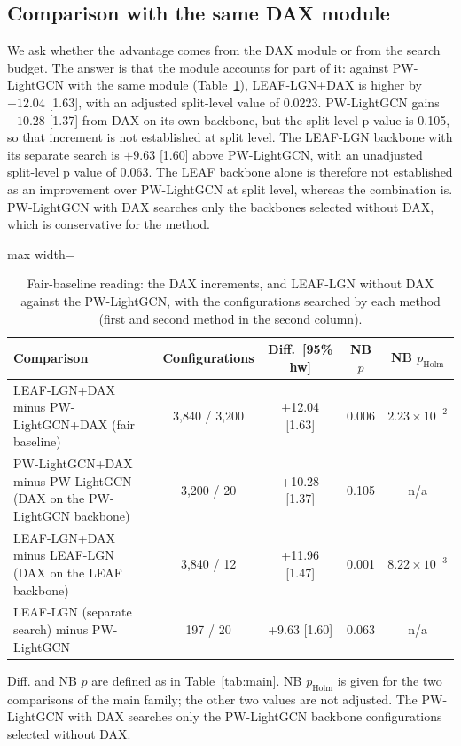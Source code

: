 \documentclass[preprint,12pt,authoryear]{elsarticle}
\begin{document}
\subsection{Comparison with the same DAX module}
\label{sec:res-fair}

We ask whether the advantage comes from the DAX module or from the search budget. The answer is that the module accounts for part of it: against PW-LightGCN with the same module (Table~\ref{tab:fair}), LEAF-LGN+DAX is higher by $+12.04$ [1.63], with an adjusted split-level value of 0.0223. PW-LightGCN gains $+10.28$ [1.37]
from DAX on its own backbone, but the split-level p value is 0.105, so that increment is not established at split level. The LEAF-LGN backbone with its
separate search is $+9.63$ [1.60] above PW-LightGCN, with an unadjusted split-level p value of 0.063. The LEAF backbone alone is therefore not established
as an improvement over PW-LightGCN at split level, whereas the combination is. PW-LightGCN with DAX searches only the backbones selected without DAX,
which is conservative for the method.

\begin{table}[tbp]
\centering
\footnotesize
\caption{Fair-baseline reading: the DAX increments, and LEAF-LGN without DAX against the PW-LightGCN, with the configurations searched by each method (first and second method in the second column).}
\label{tab:fair}
\begin{adjustbox}{max width=\linewidth}
\begin{tabular}{lcccc}
\toprule
Comparison & Configurations & Diff.\ [95\% hw] & NB $p$ & NB $p_{\mathrm{Holm}}$ \\
\midrule
LEAF-LGN+DAX minus PW-LightGCN+DAX (fair baseline) & 3,840 / 3,200 & +12.04 [1.63] & 0.006 & $2.23\times10^{-2}$ \\
PW-LightGCN+DAX minus PW-LightGCN (DAX on the PW-LightGCN backbone) & 3,200 / 20 & +10.28 [1.37] & 0.105 & n/a \\
LEAF-LGN+DAX minus LEAF-LGN (DAX on the LEAF backbone) & 3,840 / 12 & +11.96 [1.47] & 0.001 & $8.22\times10^{-3}$ \\
LEAF-LGN (separate search) minus PW-LightGCN & 197 / 20 & +9.63 [1.60] & 0.063 & n/a \\
\bottomrule
\end{tabular}
\end{adjustbox}
\par\smallskip
\begin{minipage}{\linewidth}\raggedright\footnotesize Diff. and NB $p$ are defined as in Table~\ref{tab:main}. NB $p_{\mathrm{Holm}}$ is given for the two comparisons of the main family; the other two values are not adjusted. The PW-LightGCN with DAX searches only the PW-LightGCN backbone configurations selected without DAX.\end{minipage}
\end{table}
\end{document}

